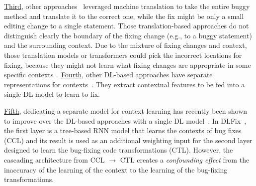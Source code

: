 \underline{Third}, other
approaches~\cite{hata2018learning,tufano2019learning,tufano2018empirical}
leveraged machine translation to take the entire buggy
method and translate it to the correct one, while the fix might be
only a small editing change to a single statement. Those
translation-based approaches do not distinguish clearly the
  boundary of the fixing change (e.g., to a buggy statement) and the
surrounding context.
Due to the mixture of fixing changes and context, those translation
models or transformers could pick the incorrect locations for fixing,
because they might not learn what fixing changes are appropriate in
some specific contexts~\cite{icse20}. \underline{Fourth}, other
DL-based approaches have separate representations for
contexts~\cite{chen2018sequencer,cure-icse21,lutellier2020coconut}.
They extract contextual features to be fed into a single DL
model to learn to fix.

\underline{Fifth}, dedicating a separate model for context learning
has recently been shown to improve over the DL-based approaches with a
single DL model~\cite{icse20}. In DLFix~\cite{icse20}, the first layer
is a tree-based RNN model that learns the contexts of bug fixes (CCL)
and its result is used as an additional weighting input for the second
layer designed to learn the bug-fixing code transformations
(CTL). However, the cascading architecture from CCL $\rightarrow$ CTL
creates a {\em confounding effect} from the inaccuracy of the learning
of the context to the learning of the bug-fixing
transformations.




